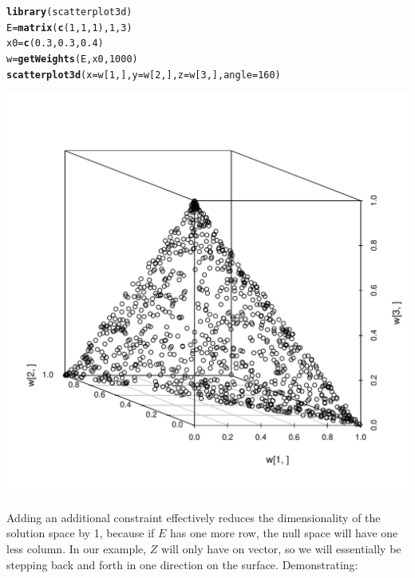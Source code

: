 \documentclass{article}\usepackage{graphicx, color}
\makeatletter
\def\maxwidth{ %
  \ifdim\Gin@nat@width>\linewidth
    \linewidth
  \else
    \Gin@nat@width
  \fi
}
\newcommand{\hlfunctioncall}[1]{\textcolor[rgb]{0.501960784313725,0,0.329411764705882}{\textbf{#1}}}%
\newenvironment{kframe}{%
 \def\at@end@of@kframe{}%
 \ifinner\ifhmode%
  \def\at@end@of@kframe{\end{minipage}}%
  \begin{minipage}{\columnwidth}%
 \fi\fi%
 \def\FrameCommand##1{\hskip\@totalleftmargin \hskip-\fboxsep
 \colorbox{shadecolor}{##1}\hskip-\fboxsep
     \hskip-\linewidth \hskip-\@totalleftmargin \hskip\columnwidth}%
 \MakeFramed {\advance\hsize-\width
   \@totalleftmargin\z@ \linewidth\hsize
   \@setminipage}}%
 {\par\unskip\endMakeFramed%
 \at@end@of@kframe}
\newenvironment{knitrout}{}{} %
\makeatother
\begin{document}
\begin{knitrout}
\color{fgcolor}\begin{kframe}
\begin{alltt}
\hlfunctioncall{library}(scatterplot3d)
E = \hlfunctioncall{matrix}(\hlfunctioncall{c}(1, 1, 1), 1, 3)
x0 = \hlfunctioncall{c}(0.3, 0.3, 0.4)
w = \hlfunctioncall{getWeights}(E, x0, 1000)
\hlfunctioncall{scatterplot3d}(x = w[1, ], y = w[2, ], z = w[3, ], angle = 160)
\end{alltt}
\end{kframe}
\includegraphics[width=\maxwidth]{figure/rcodeblockyeah} 

\end{knitrout}


Adding an additional constraint effectively reduces the dimensionality
of the solution space by 1, because if $E$ has one more row, the null
space will have one less column. In our example, $Z$ will only have on
vector, so we will essentially be stepping back and forth in one
direction on the surface. Demonstrating:
\end{document}

